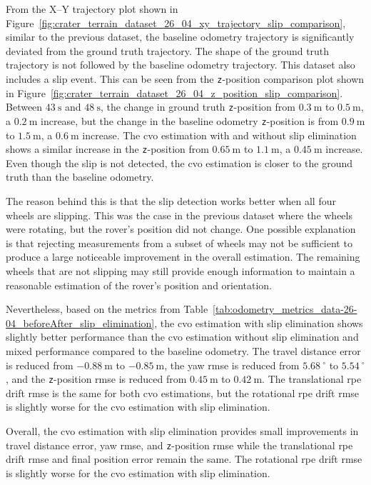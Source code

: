 \documentclass[report.tex]{subfiles}
\begin{document}
    From the X--Y trajectory plot shown in Figure~\ref{fig:crater_terrain_dataset_26_04_xy_trajectory_slip_comparison}, similar to the previous dataset, the baseline odometry trajectory is significantly deviated from the ground truth trajectory. The shape of the ground truth trajectory is not followed by the baseline odometry trajectory. This dataset also includes a slip event. This can be seen from the \texttt{z}-position comparison plot shown in Figure~\ref{fig:crater_terrain_dataset_26_04_z_position_slip_comparison}. Between $43~\mathrm{s}$ and $48~\mathrm{s}$, the change in ground truth \texttt{z}-position from $0.3~\mathrm{m}$ to $0.5~\mathrm{m}$, a $0.2~\mathrm{m}$ increase, but the change in the baseline odometry \texttt{z}-position is from $0.9~\mathrm{m}$ to $1.5~\mathrm{m}$, a $0.6~\mathrm{m}$ increase. The \gls{cvo} estimation with and without slip elimination shows a similar increase in the \texttt{z}-position from $0.65~\mathrm{m}$ to 
    $1.1~\mathrm{m}$, a $0.45~\mathrm{m}$ increase. Even though the slip is not detected, the \gls{cvo} estimation is closer to the ground truth than the baseline odometry. 
    
    The reason behind this is that the slip detection works better when all four wheels are slipping. This was the case in the previous dataset where the wheels were rotating, but the rover's position did not change. One possible explanation is that rejecting measurements from a subset of wheels may not be sufficient to produce a large noticeable improvement in the overall estimation. The remaining wheels that are not slipping may still provide enough information to maintain a reasonable estimation of the rover's position and orientation.  
    
    Nevertheless, based on the metrics from Table~\ref{tab:odometry_metrics_data-26-04_beforeAfter_slip_elimination}, the \gls{cvo} estimation with slip elimination shows slightly better performance than the \gls{cvo} estimation without slip elimination and mixed performance compared to the baseline odometry. The travel distance error is reduced from $-0.88~\mathrm{m}$ to $-0.85~\mathrm{m}$, the yaw \gls{rmse} is reduced from $5.68~^\circ$ to $5.54~^\circ$, and the \texttt{z}-position \gls{rmse} is reduced from $0.45~\mathrm{m}$ to $0.42~\mathrm{m}$. The translational \gls{rpe} drift \gls{rmse} is the same for both \gls{cvo} estimations, but the rotational \gls{rpe} drift \gls{rmse} is slightly worse for the \gls{cvo} estimation with slip elimination.
    
    Overall, the \gls{cvo} estimation with slip elimination provides small improvements in travel distance error, yaw \gls{rmse}, and \texttt{z}-position \gls{rmse} while the translational \gls{rpe} drift \gls{rmse} and final position error remain the same. The rotational \gls{rpe} drift \gls{rmse} is slightly worse for the \gls{cvo} estimation with slip elimination. 
    \FloatBarrier
    
\end{document}
